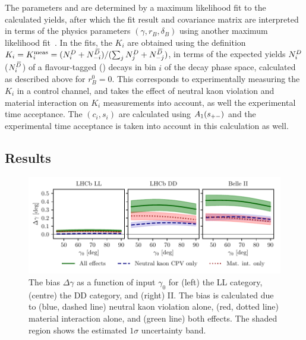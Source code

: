 The parameters \xpm and \ypm are determined by a maximum likelihood fit to the calculated yields, after which the fit result and covariance matrix are interpreted in terms of the physics parameters $(\gamma, r_B, \delta_B)$ using another maximum likelihood fit~\cite{LHCb-PAPER-2016-032}. In the fits, the $K_i$ are obtained using the definition $K_i=K_i^\text{meas}=({N^{D}_i + N^{\kern 0.18em\overline{\kern -0.18em D}}_{-i}})/({\sum_j N^{D}_j +N^{\kern 0.18em\overline{\kern -0.18em D}}_{-j}})$, in terms of the expected yields $N^{D}_i$ ($N^{{\kern 0.18em\overline{\kern -0.18em D}}}_i$) of a flavour-tagged \Dz (\Dzb) decays in bin $i$ of the \D decay phase space, calculated as described above for $r_B^0=0$. This corresponds to experimentally measuring the $K_i$ in a control channel, and takes the effect of neutral kaon \CP violation and material interaction on $K_i$ measurements into account, as well the experimental time acceptance. The $(c_i, s_i)$ are calculated using $A_1(s_{+-})$ and the experimental time acceptance is taken into account in this calculation as well. 







 











\subsection{Results} %
\label{sub:bias_results}


\begin{figure}[tbp]
    \centering
    \includegraphics{figures/ks_chapter/gamma_scan_Belle2018_50_g.pdf}
    \caption{The bias $\Delta \gamma$ as a function of input $\gamma_0$ for (left) the LL \lhcb category, (centre) the DD \lhcb category, and (right) \belle II. The bias is calculated due to (blue, dashed line) neutral kaon \CP violation alone, (red, dotted line) material interaction alone, and (green line) both effects. The shaded region shows the estimated $1\sigma$ uncertainty band.}
    \label{fig:compare_experiments}
\end{figure}


